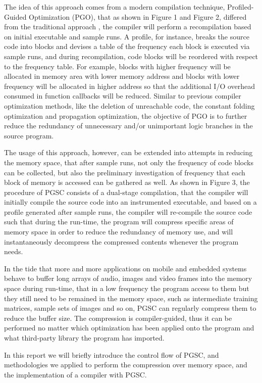 \documentclass[]{article}
\begin{document}
The idea of this approach comes from a modern compilation technique, Profiled-Guided Optimization (PGO), that as shown in Figure 1 and Figure 2, differed from the traditional approach \cite{CompilerDesign}, the compiler will perform a recompilation based on initial executable and sample runs. A profile, for instance, breaks the source code into blocks and devises a table of the frequency each block is executed via sample runs, and during recompilation, code blocks will be reordered with respect to the frequency table. For example, blocks with higher frequency will be allocated in memory area with lower memory address and blocks with lower frequency will be allocated in higher address so that the additional I/O overhead consumed in function callbacks will be reduced. Similar to previous compiler optimization methods, like the deletion of unreachable code, the constant folding optimization and propagation optimization, the objective of PGO is to further reduce the redundancy of unnecessary and/or unimportant logic branches in the source program. \par 
The usage of this approach, however, can be extended into attempts in reducing the memory space, that after sample runs, not only the frequency of code blocks can be collected, but also the preliminary investigation of frequency that each block of memory is accessed can be gathered as well. As shown in Figure 3, the procedure of PGSC consists of a dual-stage compilation, that the compiler will initially compile the source code into an instrumented executable, and based on a profile generated after sample runs, the compiler will re-compile the source code such that during the run-time, the program will compress specific areas of memory space in order to reduce the redundancy of memory use, and will instantaneously decompress the compressed contents whenever the program needs. \par 
In the tide that more and more applications on mobile and embedded systems behave to buffer long arrays of audio, images and video frames into the memory space during run-time, that in a low frequency the program access to them but they still need to be remained in the memory space, such as intermediate training matrices, sample sets of images and so on, PGSC can regularly compress them to reduce the buffer size. The compression is compiler-guided, thus it can be performed no matter which optimization has been applied onto the program and what third-party library the program has imported. \par 
In this report we will briefly introduce the control flow of PGSC, and methodologies we applied to perform the compression over memory space, and the implementation of a compiler with PGSC. 
\end{document}
